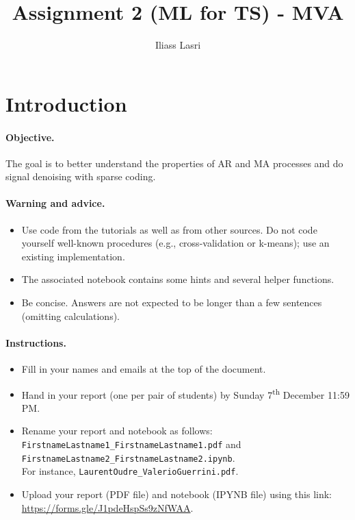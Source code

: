 \documentclass[11pt]{article}
\title{Assignment 2 (ML for TS) - MVA}
\author{
Iliass Lasri \email{iliass.lasri@telecom-paris.fr} \\ %
}
\begin{document}
\maketitle

\section{Introduction}

\paragraph{Objective.} The goal is to better understand the properties of AR and MA processes and do signal denoising with sparse coding.

\paragraph{Warning and advice.} 
\begin{itemize}
    \item Use code from the tutorials as well as from other sources. Do not code yourself well-known procedures (e.g., cross-validation or k-means); use an existing implementation. 
    \item The associated notebook contains some hints and several helper functions.
    \item Be concise. Answers are not expected to be longer than a few sentences (omitting calculations).
\end{itemize}



\paragraph{Instructions.}
\begin{itemize}
    \item Fill in your names and emails at the top of the document.
    \item Hand in your report (one per pair of students) by Sunday 7\textsuperscript{th} December 11:59 PM.
    \item Rename your report and notebook as follows:\\ \texttt{FirstnameLastname1\_FirstnameLastname1.pdf} and\\ \texttt{FirstnameLastname2\_FirstnameLastname2.ipynb}.\\
    For instance, \texttt{LaurentOudre\_ValerioGuerrini.pdf}.
    \item Upload your report (PDF file) and notebook (IPYNB file) using this link: \href{https://forms.gle/J1pdeHspSs9zNfWAA}{https://forms.gle/J1pdeHspSs9zNfWAA}.
\end{itemize}
\end{document}
